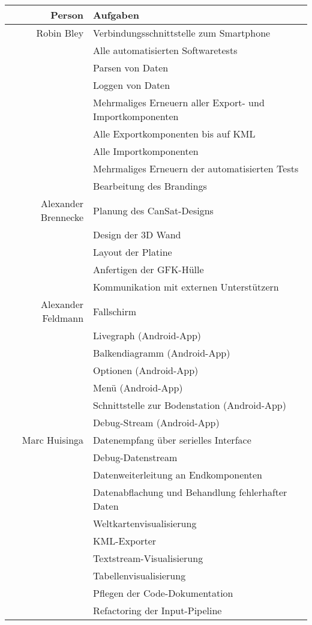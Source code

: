 \begin{table}[H]
	\centering
	\begin{tabular}{rl}
		\toprule
		\textbf{Person} & \textbf{Aufgaben} \\
		\midrule
		Robin Bley & Verbindungsschnittstelle zum Smartphone \\
		 & Alle automatisierten Softwaretests \\
		 & Parsen von Daten\\
		 & Loggen von Daten \\
		 & Mehrmaliges Erneuern aller Export- und Importkomponenten\\
		 & Alle Exportkomponenten bis auf KML \\
		 & Alle Importkomponenten\\
		 & Mehrmaliges Erneuern der automatisierten Tests\\
		 & Bearbeitung des Brandings\\
		Alexander Brennecke & Planung des CanSat-Designs\\
		& Design der 3D Wand\\
		& Layout der Platine\\
		& Anfertigen der GFK-Hülle\\
		& Kommunikation mit externen Unterstützern\\
		Alexander Feldmann & Fallschirm \\
		 & Livegraph (Android-App) \\
		 & Balkendiagramm (Android-App) \\
		 & Optionen (Android-App) \\
		 & Menü (Android-App) \\
		 & Schnittstelle zur Bodenstation (Android-App) \\
		 & Debug-Stream (Android-App) \\
		Marc Huisinga & Datenempfang über serielles Interface \\
		 & Debug-Datenstream \\
		 & Datenweiterleitung an Endkomponenten \\
		 & Datenabflachung und Behandlung fehlerhafter Daten \\
		 & Weltkartenvisualisierung \\
		 & KML-Exporter \\
		 & Textstream-Visualisierung \\
		 & Tabellenvisualisierung \\
		 & Pflegen der Code-Dokumentation \\
		 & Refactoring der Input-Pipeline \\

\end{tabular}
\end{table}
